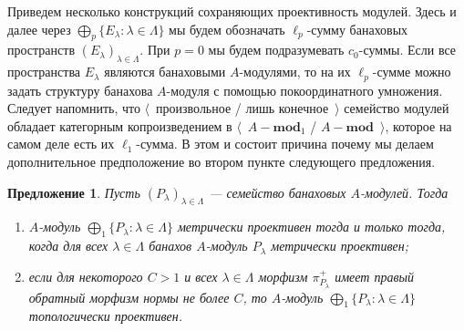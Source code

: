 \documentclass[12pt]{article}
\newtheorem{proposition}[theorem]{Предложение}
\begin{document}
Приведем несколько конструкций сохраняющих проективность модулей. Здесь и далее
через $\bigoplus_p \{ E_\lambda:\lambda\in\Lambda \}$ мы будем обозначать
$\ell_p$-сумму банаховых пространств ${(E_\lambda)}_{\lambda\in\Lambda}$. При
$p=0$ мы будем подразумевать $c_0$-суммы. Если все пространства $E_\lambda$
являются банаховыми $A$-модулями, то на их $\ell_p$-сумме можно задать структуру
банахова $A$-модуля с помощью покоординатного умножения. Следует напомнить, что
$\langle$~произвольное / лишь конечное~$\rangle$ семейство модулей обладает
категорным копроизведением в $\langle$~$A-\mathbf{mod}_1$ /
$A-\mathbf{mod}$~$\rangle$, которое на самом деле есть их $\ell_1$-сумма. В этом
и состоит причина почему мы делаем дополнительное предположение во втором пункте
следующего предложения.

\begin{proposition}\label{MetTopProjModCoprod} Пусть
    ${(P_\lambda)}_{\lambda\in\Lambda}$ --- семейство банаховых $A$-модулей.
    Тогда
    \begin{enumerate}[label = (\roman*)]
        \item $A$-модуль $\bigoplus_1 \{P_\lambda:\lambda\in\Lambda \}$ метрически
              проективен тогда и только тогда, когда для всех $\lambda\in\Lambda$ банахов
              $A$-модуль $P_\lambda$ метрически проективен;

        \item если для некоторого $C>1$ и всех $\lambda\in\Lambda$ морфизм
              $\pi_{P_\lambda}^+$ имеет правый обратный морфизм нормы не более $C$, то
              $A$-модуль $\bigoplus_1 \{P_\lambda:\lambda\in\Lambda \}$ топологически
              проективен.
    \end{enumerate}


\end{proposition}
\end{document}
